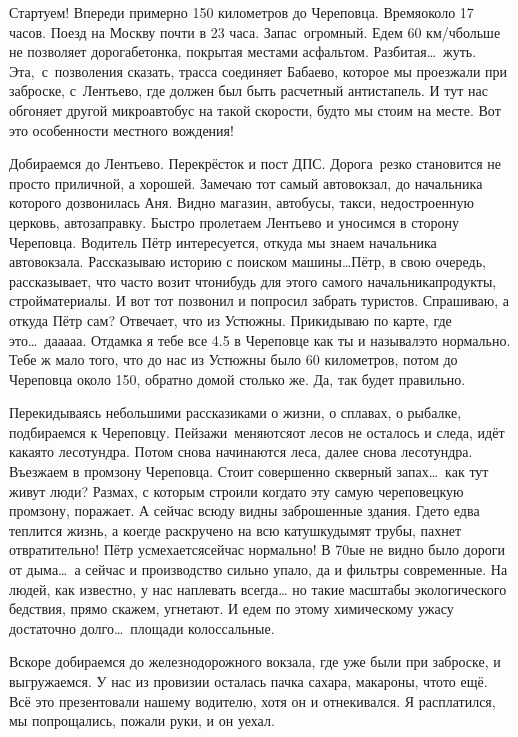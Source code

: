 Стартуем! Впереди примерно 150 километров до Череповца. Время\mdash около 17 часов. Поезд на Москву почти в 23 часа. Запас~огромный. Едем 60 км/ч\mdash больше не позволяет дорога\mdash бетонка, покрытая местами асфальтом. Разбитая\ldots~жуть. Эта,~с~позволения сказать, трасса соединяет Бабаево, которое мы проезжали при заброске, с~Лентьево, где должен был быть расчетный антистапель. И тут нас обгоняет другой микроавтобус на такой скорости, будто мы стоим на месте. Вот это особенности местного вождения! 

Добираемся до Лентьево. Перекрёсток и пост ДПС. Дорога~резко становится не просто приличной, а хорошей. Замечаю тот самый автовокзал, до начальника которого дозвонилась Аня. Видно магазин, автобусы, такси, недостроенную церковь, автозаправку. Быстро пролетаем Лентьево и уносимся в сторону Череповца. Водитель Пётр интересуется, откуда мы знаем начальника автовокзала. Рассказываю историю с поиском машины\ldots Пётр, в свою очередь, рассказывает, что часто возит что\sdash нибудь для этого самого начальника\mdash продукты, стройматериалы. И вот тот позвонил и попросил забрать туристов. Спрашиваю, а откуда Пётр сам? Отвечает, что из Устюжны. Прикидываю по карте, где это\ldots~да\sdash а\sdash а\sdash а\sdash а. Отдам\sdash ка я тебе все 4.5 в Череповце как ты и называл\mdash это нормально. Тебе ж мало того, что до нас из Устюжны было 60 километров, потом до Череповца около 150, обратно домой столько же. Да, так будет правильно. 

Перекидываясь небольшими рассказиками о жизни, о сплавах, о рыбалке, подбираемся к Череповцу. Пейзажи~меняются\mdash от лесов не осталось и следа, идёт какая\sdash то лесотундра. Потом снова начинаются леса, далее снова лесотундра. Въезжаем в промзону Череповца. Стоит совершенно скверный запах\ldots~как тут живут люди? Размах, с которым строили когда\sdash то эту самую череповецкую промзону, поражает. А сейчас всюду видны заброшенные здания. Где\sdash то едва теплится жизнь, а кое\sdash где раскручено на всю катушку\mdash дымят трубы, пахнет отвратительно! Пётр усмехается\mdash сейчас нормально! В 70\sdash ые не видно было дороги от дыма\ldots~а сейчас и производство сильно упало, да и фильтры современные. На людей, как известно, у нас наплевать всегда… но такие масштабы экологического бедствия, прямо скажем, угнетают. И едем по этому химическому ужасу достаточно долго\ldots~площади колоссальные.

Вскоре добираемся до железнодорожного вокзала, где уже были при заброске, и выгружаемся. У нас из провизии осталась пачка сахара, макароны, что\sdash то ещё. Всё это презентовали нашему водителю, хотя он и отнекивался. Я расплатился, мы попрощались, пожали руки, и он уехал. 

